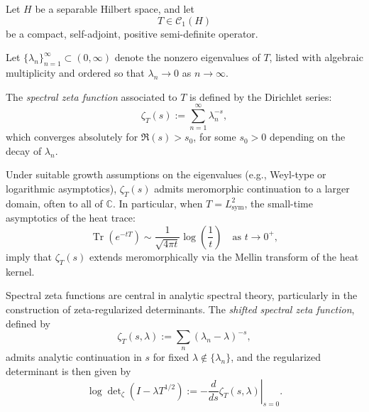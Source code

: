 \begin{definition}
\label{def:spectral_zeta_function}

Let \( H \) be a separable Hilbert space, and let
\[
T \in \mathcal{C}_1(H)
\]
be a compact, self-adjoint, positive semi-definite operator.

Let \( \{ \lambda_n \}_{n=1}^\infty \subset (0,\infty) \) denote the nonzero eigenvalues of \( T \), listed with algebraic multiplicity and ordered so that \( \lambda_n \to 0 \) as \( n \to \infty \).

\medskip

The \emph{spectral zeta function} associated to \( T \) is defined by the Dirichlet series:
\[
\zeta_T(s) := \sum_{n=1}^\infty \lambda_n^{-s},
\]
which converges absolutely for \( \Re(s) > s_0 \), for some \( s_0 > 0 \) depending on the decay of \( \lambda_n \).

\medskip

Under suitable growth assumptions on the eigenvalues (e.g., Weyl-type or logarithmic asymptotics), \( \zeta_T(s) \) admits meromorphic continuation to a larger domain, often to all of \( \mathbb{C} \). In particular, when \( T = L_{\mathrm{sym}}^2 \), the small-time asymptotics of the heat trace:
\[
\operatorname{Tr}(e^{-t T}) \sim \frac{1}{\sqrt{4\pi t}} \log\left( \frac{1}{t} \right)
\quad \text{as } t \to 0^+,
\]
imply that \( \zeta_T(s) \) extends meromorphically via the Mellin transform of the heat kernel.

\medskip

Spectral zeta functions are central in analytic spectral theory, particularly in the construction of zeta-regularized determinants. The \emph{shifted spectral zeta function}, defined by
\[
\zeta_T(s, \lambda) := \sum_n (\lambda_n - \lambda)^{-s},
\]
admits analytic continuation in \( s \) for fixed \( \lambda \notin \{\lambda_n\} \), and the regularized determinant is then given by
\[
\log \det\nolimits_\zeta(I - \lambda T^{1/2}) := -\left.\frac{d}{ds} \zeta_T(s, \lambda)\right|_{s = 0}.
\]
\end{definition}
% 